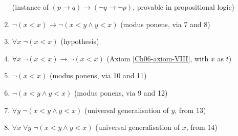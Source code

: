 \begin{enumerate}
    \hfill (instance of \((p\rightarrow q)\rightarrow(\neg q \rightarrow\neg p)\), provable in propositional logic)

    \item \(\neg(x < x) \rightarrow \neg(x < y \land y < x)\)
    \hfill (modus ponens, via 7 and 8)

    \item \(\forall x\; \neg(x < x)\)
    \hfill (hypothesis)

    \item \(\forall x\; \neg(x < x) \rightarrow \neg(x < x)\)
    \hfill (Axiom \ref{Ch06-axiom-VIII}, with \(x\) as \(t\))

    \item \(\neg(x < x)\)
    \hfill (modus ponens, via 10 and 11)

    \item \(\neg(x < y \land y < x)\)
    \hfill (modus ponens, via 9 and 12)

    \item \(\forall y\; \neg(x < y \land y < x)\)
    \hfill (universal generalisation of \(y\), from 13)

    \item \(\forall x\; \forall y\; \neg(x < y \land y < x)\)
    \hfill (universal generalisation of \(x\), from 14)
\end{enumerate}